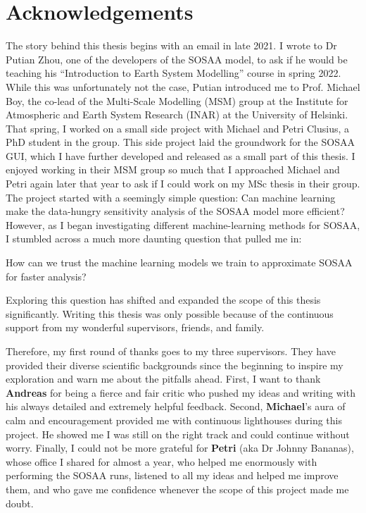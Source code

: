 \newenvironment{acknowledgements}[1][Acknowledgements]{
    \chapter*{#1}\markboth{}{}
    \thispagestyle{empty}
}{\clearpage}

\begin{acknowledgements}
    The story behind this thesis begins with an email in late 2021. I wrote to Dr Putian Zhou, one of the developers of the SOSAA model, to ask if he would be teaching his ``Introduction to Earth System Modelling'' course in spring 2022. While this was unfortunately not the case, Putian introduced me to Prof. Michael Boy, the co-lead of the Multi-Scale Modelling (MSM) group at the Institute for Atmospheric and Earth System Research (INAR) at the University of Helsinki. That spring, I worked on a small side project with Michael and Petri Clusius, a PhD student in the group. This side project laid the groundwork for the SOSAA GUI, which I have further developed and released as a small part of this thesis. I enjoyed working in their MSM group so much that I approached Michael and Petri again later that year to ask if I could work on my MSc thesis in their group. The project started with a seemingly simple question: Can machine learning make the data-hungry sensitivity analysis of the SOSAA model more efficient? However, as I began investigating different machine-learning methods for SOSAA, I stumbled across a much more daunting question that pulled me in:

    \begin{center}
        How can we trust the machine learning models we train to approximate SOSAA for faster analysis?
    \end{center}

    \noindent Exploring this question has shifted and expanded the scope of this thesis significantly. Writing this thesis was only possible because of the continuous support from my wonderful supervisors, friends, and family.

    \newpar Therefore, my first round of thanks goes to my three supervisors. They have provided their diverse scientific backgrounds since the beginning to inspire my exploration and warn me about the pitfalls ahead. First, I want to thank \textbf{Andreas} for being a fierce and fair critic who pushed my ideas and writing with his always detailed and extremely helpful feedback. Second, \textbf{Michael}'s aura of calm and encouragement provided me with continuous lighthouses during this project. He showed me I was still on the right track and could continue without worry. Finally, I could not be more grateful for \textbf{Petri} (aka Dr Johnny Bananas), whose office I shared for almost a year, who helped me enormously with performing the SOSAA runs, listened to all my ideas and helped me improve them, and who gave me confidence whenever the scope of this project made me doubt.


\end{acknowledgements}
